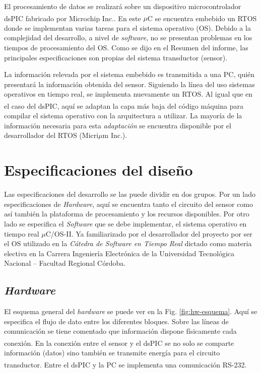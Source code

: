 \documentclass[11pt,a4paper,oneside]{article}
\def\uCOS{$\mu$C/OS-II\texttrademark}
\begin{document}
El procesamiento de datos se realizará sobre un dispositivo microcontrolador dsPIC\textsuperscript{\textregistered}  fabricado por Microchip Inc.. En este $\mu$C se encuentra embebido un RTOS donde se implementan varias tareas para el sistema operativo (OS). Debido a la complejidad del desarrollo, a nivel de \textsl{software}, no se presentan problemas en los tiempos de procesamiento del OS. Como se dijo en el Resumen del informe, las principales especificaciones son propias del sistema transductor (sensor).

La información relevada por el sistema embebido es transmitida a una PC, quién presentará la información obtenida del sensor. Siguiendo la línea del uso sistemas operativos en tiempo real, se implementa nuevamente un RTOS. Al igual que en el caso del dsPIC\textsuperscript{\textregistered}, aquí se adaptan la capa más baja del código máquina para compilar el sistema operativo con la arquitectura a utilizar. La mayoría de la información necesaria para esta \emph{adaptación} se encuentra disponible por el desarrollador del RTOS (Micri$\mu$m Inc.).

\section{Especificaciones del diseño}
\label{sec:esp-diseno}

Las especificaciones del desarrollo se las puede dividir en dos grupos. Por un lado especificaciones de \emph{Hardware}, aquí se encuentra tanto el circuito del sensor como así también la plataforma de procesamiento y los recursos disponibles. Por otro lado se especifica el \emph{Software} que se debe implementar, el sistema operativo en tiempo real \uCOS. Ya familiarizado por el desarrollador del proyecto por ser el OS utilizado en la \emph{Cátedra de Software en Tiempo Real} dictado como materia electiva en la Carrera Ingeniería Electrónica de la Universidad Tecnológica Nacional -- Facultad Regional Córdoba.

\subsection{\textsl{Hardware}}
\label{sec:esp-hw}

El esquema general del \textsl{hardware} se puede ver en la Fig. \ref{fig:hw-esquema}. Aquí se especifica el flujo de dato entre los diferentes bloques. Sobre las líneas de comunicación se tiene comentado que información dispone físicamente cada conexión. En la conexión entre el sensor y el dsPIC\textsuperscript{\textregistered} se no solo se comparte información (datos) sino también se transmite energía para el circuito transductor. Entre el dsPIC\textsuperscript{\textregistered} y la PC se implementa una comunicación RS-232.
\end{document}
